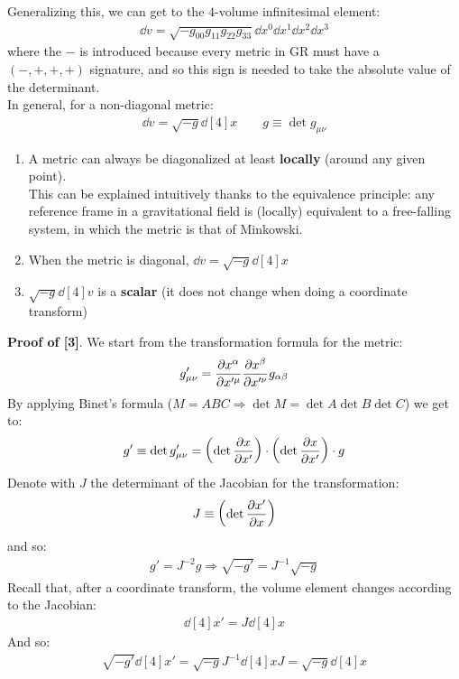 \documentclass[../template.tex]{subfiles}
\begin{document}
Generalizing this, we can get to the $4$-volume infinitesimal element:
\begin{align*}
    \dd{v} = \sqrt{-g_{00} g_{11} g_{22} g_{33} }\dd{x^0} \dd{x^1} \dd{x^2} \dd{x^3}
\end{align*} 
where the $-$ is introduced because every metric in GR must have a $(-,+,+,+)$ signature, and so this sign is needed to take the absolute value of the determinant.\\
In general, for a non-diagonal metric:
\begin{align*}
    \dd{v} = \sqrt{-g} \dd[4]{x} \qquad g \equiv \operatorname{det} g_{\mu \nu}
\end{align*}  

\begin{enumerate}
    \item A metric can always be diagonalized at least \textbf{locally} (around any given point).\\
    This can be explained intuitively thanks to the equivalence principle: any reference frame in a gravitational field is (locally) equivalent to a free-falling system, in which the metric is that of Minkowski.
    \item When the metric is diagonal, $\dd{v} = \sqrt{-g} \dd[4]{x}$
    \item $\sqrt{-g}\dd[4]{v}$ is a \textbf{scalar} (it does not change when doing a coordinate transform)   
\end{enumerate}

\textbf{Proof of [3]}. We start from the transformation formula for the metric:
\begin{align*}
    g'_{\mu \nu} = \pdv{x^\alpha}{x'^\mu} \pdv{x^\beta}{x'^\nu} g_{\alpha \beta}
\end{align*} 
By applying Binet's formula ($M = A B C \Rightarrow \operatorname{det}M = \operatorname{det}A \operatorname{det}B \operatorname{det} C$) we get to:
\begin{align*}
    g' \equiv \operatorname{det} g'_{\mu \nu} = \left(\operatorname{det} \pdv{x}{x'} \right) \cdot \left(\operatorname{det} \pdv{x}{x'} \right) \cdot g
\end{align*}
Denote with $J$ the determinant of the Jacobian for the transformation:
\begin{align*}
    J \equiv \left(\operatorname{det} \pdv{x'}{x}\right)
\end{align*} 
and so:
\begin{align*}
    g' = J^{-2} g \Rightarrow \sqrt{-g'} = J^{-1}\sqrt{-g}
\end{align*}
Recall that, after a coordinate transform, the volume element changes according to the Jacobian:
\begin{align*}
    \dd[4]{x'} = J\dd[4]{x}
\end{align*}
And so:
\begin{align*}
    \sqrt{-g'} \dd[4]{x'} = \sqrt{-g} J^{-1} \dd[4]{x} J = \sqrt{-g} \dd[4]{x}
\end{align*}
\end{document}
